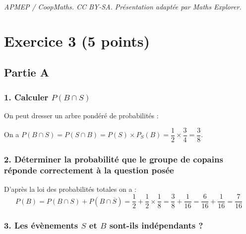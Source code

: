 \documentclass[10pt]{article}
\begin{document}
\noindent\textit{APMEP / CoopMaths. CC BY-SA. Présentation adaptée par Maths Explorer.}\par\medskip
\section*{Exercice 3 (5 points)}
	
	\subsection*{Partie A}
	
	\subsubsection*{1. Calculer $P(B \cap S)$}
	
	On peut dresser un arbre pondéré de probabilités :
	

	
	On a $P(B \cap S) = P(S \cap B) = P(S) \times P_S(B) = \dfrac{1}{2} \times \dfrac{3}{4} = \dfrac{3}{8}$.
	
	\subsubsection*{2. Déterminer la probabilité que le groupe de copains réponde correctement à la question posée}
	
	D’après la loi des probabilités totales on a :
	\[
	P(B) = P(B \cap S) + P(B \cap \overline{S}) = \dfrac{1}{2} + \dfrac{1}{2} \times \dfrac{1}{8} = \dfrac{3}{8} + \dfrac{1}{16} = \dfrac{6}{16} + \dfrac{1}{16} = \dfrac{7}{16}
	\]
	
	\subsubsection*{3. Les évènements $S$ et $B$ sont-ils indépendants ?}
	
\end{document}
